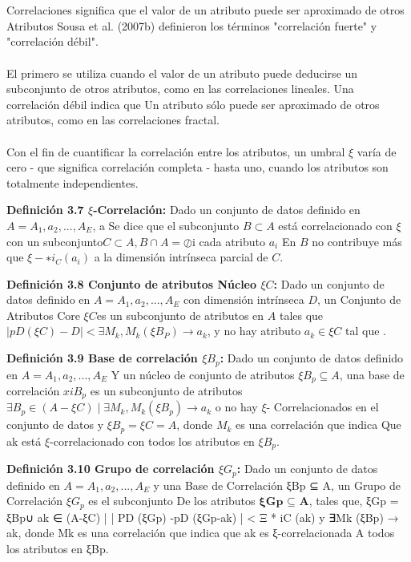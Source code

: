 \\\\
Correlaciones significa que el valor de un atributo puede ser aproximado de otros
Atributos Sousa et al. (2007b) definieron los términos "correlación fuerte" y "correlación débil".
\\\\
El primero se utiliza cuando el valor de un atributo puede deducirse un subconjunto de otros atributos, como en las correlaciones lineales. Una correlación débil indica que
Un atributo sólo puede ser aproximado de otros atributos, como en las correlaciones fractal.
\\\\

Con el fin de cuantificar la correlación entre los atributos, un umbral $\xi$ varía de cero - que significa correlación completa - hasta uno, cuando los atributos son totalmente independientes.


\textbf{Definición 3.7 $\xi$-Correlación:} Dado un conjunto de datos definido en $A = {A_1, a_2,. . . , A_E}$, a
Se dice que el subconjunto $B\subset A$ está correlacionado con $\xi$ con un subconjunto$C\subset A,B\cap A= \oslash$i cada atributo $a_i$
En $B$ no contribuye más que  $ \xi- ∗ i_C(a_i)$  a la dimensión intrínseca parcial de $C$.

\textbf{Definición 3.8 Conjunto de atributos Núcleo $\xi C$:} Dado un conjunto de datos definido en $A = {A_1, a_2,. . . , A_E}$ con dimensión intrínseca $D$, un Conjunto de Atributos Core $\xi C$es un subconjunto de atributos en $ A$ tales que$\mid pD (\xi C) -D\mid <\exists M_k,M_k(\xi B_P)\rightarrow a_k$, y no hay atributo $ a_k \in \xi C$ tal que $ $.


\textbf{Definición 3.9 Base de correlación $\xi B_p$: }Dado un conjunto de datos  definido en $A = {A_1, a_2,. . . , A_E}$
Y un núcleo de conjunto de atributos $ \xi B_p \subseteq A $, una base de correlación $ xi B_p $ es un subconjunto de atributos $\exists B_p \in (A- \xi C)\mid \exists M_k, M_k(\xi B_p)\rightarrow a_k$ o no hay $\xi$-
Correlacionados en el conjunto de datos y $\xi B_p = \xi C = A$, donde $M_k$ es una correlación que indica
Que ak está $\xi$-correlacionado con todos los atributos en $\xi B_p$.


\textbf{Definición 3.10 Grupo de correlación $\xi  G_p$:} Dado un conjunto de datos definido en $A = {A_1, a_2,. . . , A_E}$ y una Base de Correlación ξBp ⊆ A, un Grupo de Correlación $\xi  G_p$ es el subconjunto
De los atributos $\textbf{ξGp ⊆ A}$, tales que, ξGp = ξBp∪ ak ∈ (A-ξC) | | PD (ξGp) -pD (ξGp-ak) | <
Ξ * iC ({ak}) y ∃Mk (ξBp) → ak, donde Mk es una correlación que indica que ak es ξ-correlacionada
A todos los atributos en ξBp.




